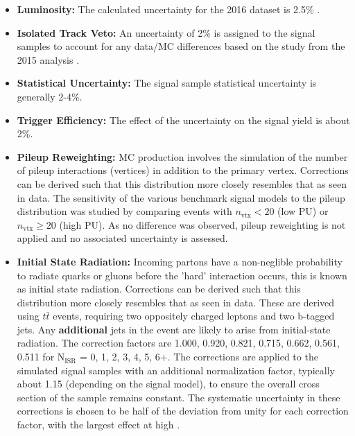 \begin{itemize}

\item {\bf Luminosity:}
The calculated uncertainty for the 2016 dataset is 2.5\% \cite{CMS-PAS-LUM-17-001}.

\item {\bf Isolated Track Veto:}
An uncertainty of 2\% is assigned to the signal samples to account for any data/MC differences based on the study from the 2015 analysis \cite{RA2b:Moriond}.

\item {\bf Statistical Uncertainty:}
The signal sample statistical uncertainty is generally 2-4\%.

\item {\bf Trigger Efficiency:}
The effect of the uncertainty on the signal yield is about 2\%.

\item {\bf Pileup Reweighting:}
MC production involves the simulation of the number of pileup interactions (vertices) in addition to the primary vertex. Corrections can be derived such that this distribution more closely resembles that as seen in data. The sensitivity of the various benchmark signal models to the pileup distribution was studied by comparing events with $n_{\textrm{vtx}} < 20$ (low PU) or $n_{\textrm{vtx}} \geq 20$ (high PU). As no difference was observed, pileup reweighting is not applied and no associated uncertainty is assessed.

\item {\bf Initial State Radiation:}
Incoming partons have a non-neglible probability to radiate quarks or gluons before the 'hard' interaction occurs, this is known as initial state radiation. Corrections can be derived such that this distribution more closely resembles that as seen in data. These are derived using $t\bar{t}$ events, requiring two oppositely charged leptons and two b-tagged jets. Any \textbf{additional} jets in the event are likely to arise from initial-state radiation. The correction factors are 1.000, 0.920, 0.821, 0.715, 0.662, 0.561, 0.511 for N$_{\textrm{ISR}}$ = 0, 1, 2, 3, 4, 5, 6+. The corrections are applied to the simulated signal samples with an additional normalization factor, typically about 1.15 (depending on the signal model), to ensure the overall cross section of the sample remains constant. The systematic uncertainty in these corrections is chosen to be half of the deviation from unity for each correction factor, with the largest effect at high \ptmiss.


\end{itemize}
